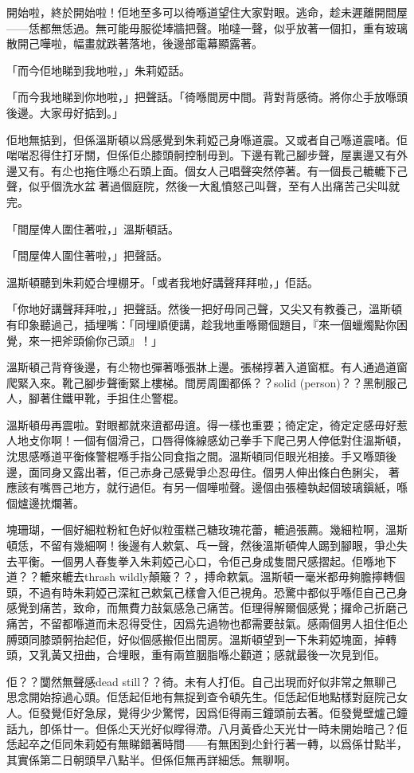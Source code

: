 開始啦，終於開始啦！佢地至多可以徛喺道望住大家對眼。逃命，趁未遲離開間屋——恁都無恁過。無可能毋服從埲牆把聲。啪噠一聲，似乎放著一個扣，重有玻璃散開己嘩啦，幅畫就跌著落地，後邊部電幕顯露著。

「而今佢地睇到我地啦，」朱莉婭話。

「而今我地睇到你地啦，」把聲話。「徛喺間房中間。背對背感徛。將你尐手放喺頭後邊。大家毋好掂到。」

佢地無掂到，但係溫斯頓以爲感覺到朱莉婭己身喺道震。又或者自己喺道震啫。佢啱啱忍得住打牙關，但係佢尐膝頭䯊控制毋到。下邊有靴己腳步聲，屋裏邊又有外邊又有。有尐也拖住喺尐石頭上面。個女人己唱聲突然停著。有一個長己轆轆下己聲，似乎個洗水盆𠌸著過個庭院，然後一大亂憤怒己叫聲，至有人出痛苦己尖叫就完。

「間屋俾人圍住著啦，」溫斯頓話。

「間屋俾人圍住著啦，」把聲話。

溫斯頓聽到朱莉婭合埋棚牙。「或者我地好講聲拜拜啦，」佢話。

「你地好講聲拜拜啦，」把聲話。然後一把好毋同己聲，又尖又有教養己，溫斯頓有印象聽過己，插埋嘴：「同埋順便講，趁我地重喺爾個題目，『來一個蠟燭點你困覺，來一把斧頭偷你己頭』！」

溫斯頓己背脊後邊，有尐物也彈著喺張牀上邊。張梯㨃著入道窗框。有人通過道窗爬緊入來。靴己腳步聲衝緊上樓梯。間房周圍都係？？solid (person)？？黑制服己人，腳著住鐵甲靴，手抯住尐警棍。

溫斯頓毋再震啦。對眼都就來逳都毋逳。得一樣也重要；徛定定，徛定定感毋好惹人地攴你啊！一個有個滑己，口唇得條線感幼己拳手下爬己男人停低對住溫斯頓，沈思感喺道平衡條警棍喺手指公同食指之間。溫斯頓同佢眼光相接。手又喺頭後邊，面同身又露出著，佢己赤身己感覺爭尐忍毋住。個男人伸出條白色脷尖，𦧷著應該有嘴唇己地方，就行過佢。有另一個嘩啦聲。邊個由張檯執起個玻璃鎭紙，喺個爐邊抌爛著。

塊珊瑚，一個好細粒粉紅色好似粒蛋糕己糖玫瑰花蕾，轆過張薦。幾細粒啊，溫斯頓恁，不留有幾細啊！後邊有人欶氣、乓一聲，然後溫斯頓俾人踢到腳眼，爭尐失去平衡。一個男人舂隻拳入朱莉婭己心口，令佢己身成隻間尺感摺起。佢喺地下道？？轆來轆去thrash wildly顛簸？？，搏命欶氣。溫斯頓一毫米都毋夠膽擰轉個頭，不過有時朱莉婭己深紅己欶氣己樣會入佢己視角。恐驚中都似乎喺佢自己己身感覺到痛苦，致命，而無費力㪗氣感急己痛苦。佢理得解爾個感覺；攞命己折磨己痛苦，不留都喺道而未忍得受住，因爲先過物也都需要㪗氣。感兩個男人抯住佢尐膊頭同膝頭䯊抬起佢，好似個感搬佢出間房。溫斯頓望到一下朱莉婭塊面，掉轉頭，又乳黃又扭曲，合埋眼，重有兩笪胭脂喺尐顴道；感就最後一次見到佢。

佢？？闅然無聲感dead still？？徛。未有人打佢。自己出現而好似非常之無聊己思念開始掠過心頭。佢恁起佢地有無捉到查令頓先生。佢恁起佢地點樣對庭院己女人。佢發覺佢好急尿，覺得少少驚愕，因爲佢得兩三鐘頭前去著。佢發覺壁爐己鐘話九，卽係廿一。但係尐天光好似𥋇得滯。八月黃昏尐天光廿一時未開始暗己？佢恁起卒之佢同朱莉婭有無睇錯著時間——有無困到尐針行著一轉，以爲係廿點半，其實係第二日朝頭早八點半。但係佢無再詳細恁。無聊啊。

